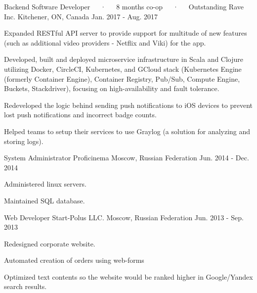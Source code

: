 

\begin{cventries}

\cventry
{Backend Software Developer~~~·~~~8 months co-op~~~·~~~Outstanding} %
{Rave Inc.} %
{Kitchener, ON, Canada} %
{Jan. 2017 - Aug. 2017} %
{
	\begin{cvitems} %
		\item {Expanded RESTful API server to provide support for multitude of new features (such as additional video providers - Netflix and Viki) for the app.}
		\item {Developed, built and deployed microservice infrastructure in Scala and Clojure utilizing Docker, CircleCI, Kubernetes, and GCloud stack (Kubernetes Engine (formerly Container Engine), Container Registry, Pub/Sub, Compute Engine,  Buckets, Stackdriver), focusing on high-availability and fault tolerance.}
		\item {Redeveloped the logic behind sending push notifications to iOS devices to prevent lost push notifications and incorrect badge counts.}
		\item {Helped teams to setup their services to use Graylog (a solution for analyzing and storing logs).}
	\end{cvitems}
}

\cventry
{System Administrator} %
{Proficinema} %
{Moscow, Russian Federation} %
{Jun. 2014 - Dec. 2014} %
{
	\begin{cvitems} %
		\item {Administered linux servers.}
		\item {Maintained SQL database.}
	\end{cvitems}
}

  \cventry
    {Web Developer} %
    {Start-Polus LLC.} %
    {Moscow, Russian Federation} %
    {Jun. 2013 - Sep. 2013} %
    {
      \begin{cvitems} %
        \item {Redesigned corporate website.}
        \item {Automated creation of orders using web-forms}
        \item {Optimized text contents so the website would be ranked higher in Google/Yandex search results.}
      \end{cvitems}
    }
\end{cventries}
